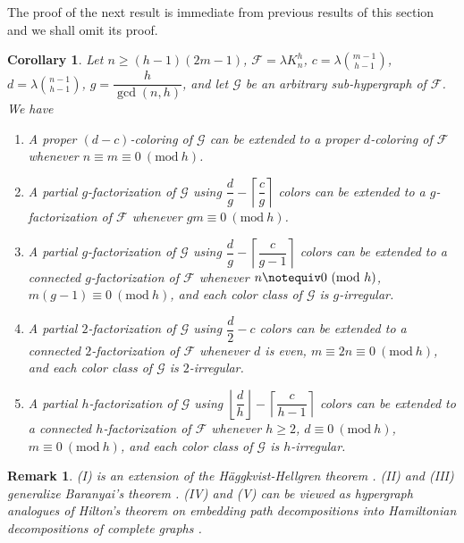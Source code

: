 \documentclass[12pt,oneside]{amsart}
\newtheorem{corollary}[theorem]{Corollary}
\newtheorem{remark}[theorem]{Remark}
\newcommand{\Mod}[1]{\ (\mathrm{mod}\ #1)}
\newcommand{\cc}{\mathcal}
\newcommand\roundup[1]{\left\lceil#1\right\rceil}
\newcommand\rounddown[1]{\left\lfloor#1\right\rfloor}
\begin{document}
The proof of the next result is immediate from previous results of this section and we shall omit its proof. 
\begin{corollary}
Let $n \geq (h-1)(2m-1)$, $\cc F= \lambda K_n^h$,  $c=\lambda \binom{m-1}{h-1}$, $d=\lambda \binom{n-1}{h-1}$, $g=\dfrac{h}{\gcd(n,h)}$, and let $\cc G$ be an arbitrary sub-hypergraph of $\cc F$. 
We have
\begin{enumerate}[label=\textup{(\Roman*)}]
     \item  A proper $(d-c)$-coloring of $\cc G$  can be extended to a proper $d$-coloring of $\cc F$ whenever $n \equiv m\equiv 0 \Mod h$. 
    \item  A partial $g$-factorization of $\cc G$ using $\dfrac{d}{g}-\roundup{\dfrac{c}{g}}$ colors can be extended to a  $g$-factorization of $\cc F$ whenever  $gm \equiv 0 \Mod h$.
    \item  A partial $g$-factorization of $\cc G$ using $\dfrac{d}{g}-\roundup{\dfrac{c}{g-1}}$ colors can be extended to a connected $g$-factorization of $\cc F$ whenever $n \notequiv 0 \Mod h$, $m(g-1) \equiv 0 \Mod h$, and each color class of $\cc G$ is $g$-irregular. 
    \item  A partial $2$-factorization of $\cc G$ using $\dfrac{d}{2}-c$ colors can be extended to a connected $2$-factorization of $\cc F$ whenever $d$ is even, $m\equiv 2n \equiv 0 \Mod h$, and each color class of $\cc G$ is $2$-irregular. 
   \item  A partial $h$-factorization of $\cc G$ using $\rounddown{\dfrac{d}{h}}-\roundup{\dfrac{c}{h-1}}$ colors can be extended to a connected $h$-factorization of $\cc F$  whenever  $h\geq 2$,  $d \equiv 0 \Mod h$, $m \equiv 0 \Mod h$, and  each color class of $\cc G$ is $h$-irregular.
\end{enumerate}
\end{corollary}
\begin{remark} \textup{  (I) is an extension of the H\"{a}ggkvist-Hellgren theorem \cite{MR1249714}.  (II) and (III) generalize Baranyai's theorem \cite{MR0416986}. (IV) and (V) can be viewed as hypergraph analogues of Hilton's theorem on embedding path decompositions into Hamiltonian decompositions of complete graphs \cite{MR746544} }.\end{remark}
\end{document}
